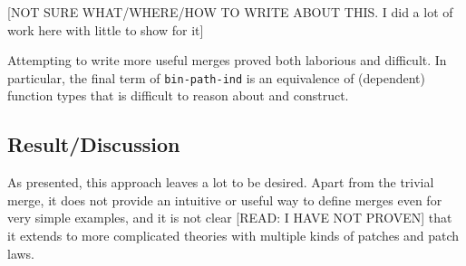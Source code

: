 [NOT SURE WHAT/WHERE/HOW TO WRITE ABOUT THIS. I did a lot of work here with little to
show for it]

Attempting to write more useful merges proved both laborious and difficult. In
particular, the final term of \texttt{bin-path-ind} is an equivalence of
(dependent) function types that is difficult to reason about and construct.

\subsection{Result/Discussion}

As presented, this approach leaves a lot to be desired. Apart from the trivial
merge, it does not provide an intuitive or useful way to define merges even for
very simple examples, and it is not clear [READ: I HAVE NOT PROVEN] that it
extends to more complicated theories with multiple kinds of patches and patch
laws.
